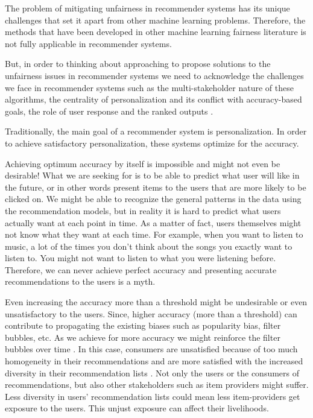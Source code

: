 The problem of mitigating unfairness in recommender systems has its unique challenges that set it apart from other machine learning problems. Therefore, the methods that have been developed in other machine learning fairness literature is not fully applicable in recommender systems.

But, in order to thinking about approaching to propose solutions to the unfairness issues in recommender systems we need to acknowledge the challenges we face in recommender systems such as the multi-stakeholder nature of these algorithms, the centrality of personalization and its conflict with accuracy-based goals, the role of user response  and the ranked outputs .

Traditionally, the main goal of a recommender system is personalization. In order to achieve satisfactory personalization, these systems optimize for the accuracy.


Achieving optimum accuracy by itself is impossible and might not even be desirable! What we are seeking for is to be able to predict what user will like in the future, or in other words present items to the users that are more likely to be clicked on. We might be able to recognize the general patterns in the data using the recommendation models, but in reality it is hard to predict what users actually want at each point in time. As a matter of fact, users themselves might not know what they want at each time. For example, when you want to listen to music, a lot of the times you don't think about the songs you exactly want to listen to. You might not want to listen to what you were listening before. Therefore, we can never achieve perfect accuracy and presenting accurate recommendations to the users is a myth.

Even increasing the accuracy more than a threshold might be undesirable or even unsatisfactory to the users. Since, higher accuracy (more than a threshold) can contribute to propagating the existing biases such as popularity bias, filter bubbles, etc. As we achieve for more accuracy we might reinforce the filter bubbles over time . In this case, consumers are unsatisfied because of too much homogeneity in their recommendations  and are more satisfied with the increased diversity in their recommendation lists . Not only the users or the consumers of recommendations, but also other stakeholders such as item providers might suffer. Less diversity in users' recommendation lists could mean less item-providers get exposure to the users. This unjust exposure can affect their livelihoods.

